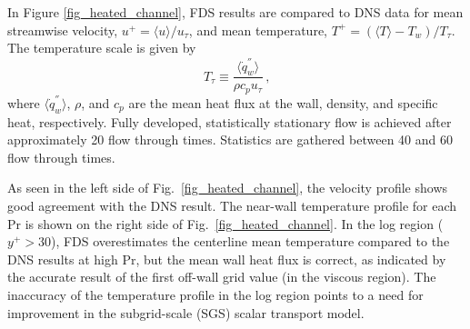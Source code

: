 \documentclass[11pt]{book}
\begin{document}
In Figure \ref{fig_heated_channel}, FDS results are compared to DNS data for mean streamwise velocity, $u^+ = \langle u \rangle/u_\tau$, and mean temperature, $T^+ = (\langle T \rangle - T_w)/T_\tau$. The temperature scale is given by
\begin{equation}
\label{eqn_friction_temperature}
T_{\tau} \equiv \frac{\langle \dot{q}_w^{''} \rangle}{{\rho}{c_p}{u_{\tau}}} \,\mbox{,}
\end{equation}
where $\langle \dot{q}_w^{''} \rangle$, $\rho$, and $c_p$ are the mean heat flux at the wall, density, and specific heat, respectively.  Fully developed, statistically stationary flow is achieved after approximately 20 flow through times.  Statistics are gathered between 40 and 60 flow through times.

As seen in the left side of Fig.~\ref{fig_heated_channel}, the velocity profile shows good agreement with the DNS result. The near-wall temperature profile for each Pr is shown on the right side of Fig.~\ref{fig_heated_channel}. In the log region ($y^+ >30$), FDS overestimates the centerline mean temperature compared to the DNS results at high Pr, but the mean wall heat flux is correct, as indicated by the accurate result of the first off-wall grid value (in the viscous region). The inaccuracy of the temperature profile in the log region points to a need for improvement in the subgrid-scale (SGS) scalar transport model.
\end{document}
